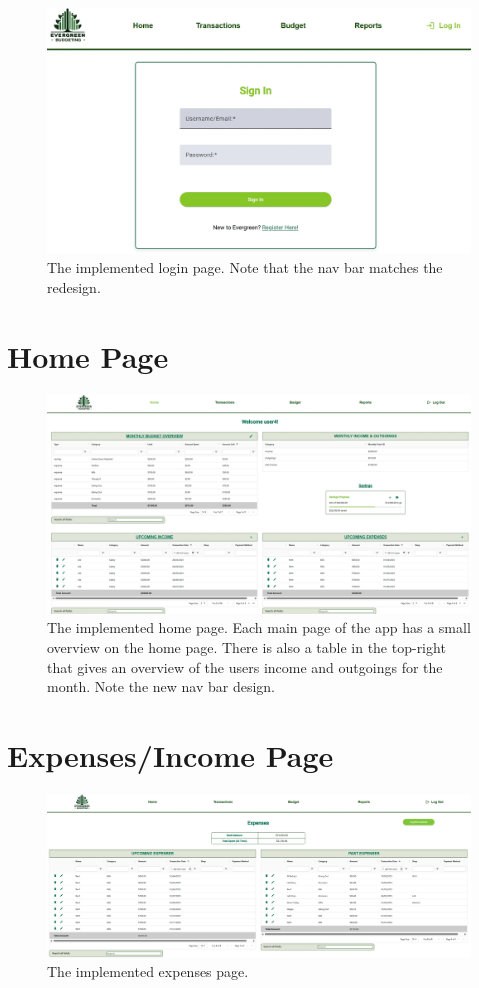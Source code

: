 \documentclass{l4proj}
\begin{document}
\begin{appendices}
\begin{figure}[htb]
    \centering
    \includegraphics[width=0.75\linewidth]{images/UI-Screenshots/login-page.png}
    \caption{The implemented login page. Note that the nav bar matches the redesign.}
    \label{fig:login-page}
\end{figure}

\section{Home Page}
\begin{figure}[H]
    \centering
    \includegraphics[width=\linewidth]{images/UI-Screenshots/home-page.png}
    \caption{The implemented home page. Each main page of the app has a small overview on the home page. There is also a table in the top-right that gives an overview of the users income and outgoings for the month. Note the new nav bar design.}
    \label{fig:reports-page}
\end{figure}

\section{Expenses/Income Page}
\begin{figure}[H]
    \centering
    \includegraphics[width=\linewidth]{images/UI-Screenshots/expenses-page.png}
    \caption{The implemented expenses page.}
    \label{fig:reports-page}
\end{figure}


\end{appendices}
\end{document}
